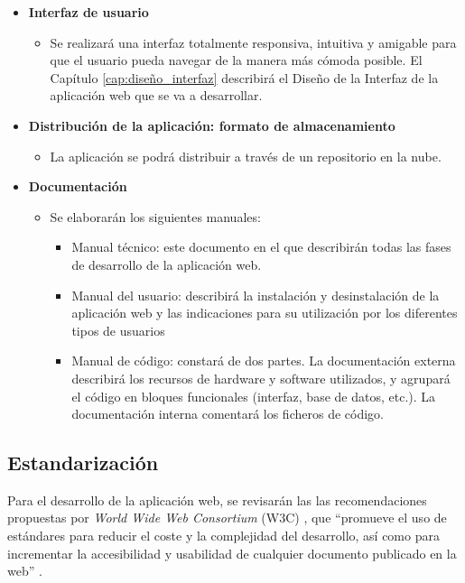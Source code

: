 \begin{itemize}
    \item \textbf{Interfaz de usuario}
    \begin{itemize}
        \item Se realizará una interfaz totalmente responsiva, intuitiva y amigable para que el usuario pueda navegar de la manera más cómoda posible. El Capítulo \ref{cap:diseño_interfaz} describirá el Diseño de la Interfaz de la aplicación web que se va  a desarrollar.
    \end{itemize}
    \item \textbf{Distribución de la aplicación: formato de almacenamiento}
     \begin{itemize}
         \item La aplicación se podrá distribuir a través de un repositorio en la nube.
     \end{itemize}
     
    \item \textbf{Documentación}
     \begin{itemize}
         \item Se elaborarán los siguientes manuales:
        \begin{itemize}
        \item Manual técnico: este documento en el que describirán todas las fases de desarrollo de la aplicación web.
        \item Manual del usuario: describirá la instalación y desinstalación de la aplicación web y las indicaciones para su utilización por los diferentes tipos de usuarios
        \item Manual de código: constará de dos partes. La documentación externa describirá los recursos de hardware y software utilizados, y agrupará el código en bloques funcionales (interfaz, base de datos, etc.). La documentación interna comentará los ficheros de código.
    \end{itemize}
     \end{itemize}
\end{itemize}


\subsection{Estandarización}

 Para el desarrollo de la aplicación web, se revisarán las 
 las recomendaciones propuestas por \textit{World Wide Web Consortium} (W3C) \cite{w3c}, que ``promueve el uso de estándares para reducir el coste y la complejidad del desarrollo, así como para incrementar la accesibilidad y usabilidad de cualquier documento publicado en la web'' \cite{revistadigital}.

